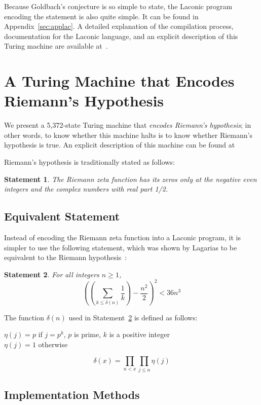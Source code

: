 \documentclass[11pt]{article}
\newtheorem{statement}{Statement}
\newcommand{\rmstatenumstate}{5,372-state }
\newenvironment{nscenter}
 {\parskip=0pt\par\nopagebreak\centering}
 {\par\noindent\ignorespacesafterend}
\begin{document}
Because Goldbach's conjecture is so simple to state, the Laconic program encoding the statement is also quite simple. It can be found in Appendix~\ref{sec:applac}. A detailed explanation of the compilation process, documentation for the Laconic language, and an explicit description of this Turing machine are available at~\cite{github}.

\section{A Turing Machine that Encodes Riemann's Hypothesis}

We present a \rmstatenumstate Turing machine that \emph{encodes Riemann's hypothesis}; in other words, to know whether this machine halts is to know whether Riemann's hypothesis is true. An explicit description of this machine can be found at~\cite{github}

Riemann's hypothesis is traditionally stated as follows:

\begin{statement}
\emph{The Riemann zeta function has its zeros only at the negative even integers and the complex numbers with real part 1/2.}
\label{goldbachstatement}
\end{statement}

\subsection{Equivalent Statement}

Instead of encoding the Riemann zeta function into a Laconic program, it is simpler to use the following statement, which was shown by Lagarias to be equivalent to the Riemann hypothesis~\cite{riemann}:

\begin{statement} \label{eq:riemann}
For all integers $n \ge 1$, 
$$\left(\left(\sum_{k \le \delta(n)} \frac{1}{k}\right) - \frac{n^2}{2}\right)^2 < 36n^3$$
\end{statement}

The function $\delta(n)$ used in Statement~\ref{eq:riemann} is defined as follows: 

\begin{nscenter}
$\eta(j) = p$ if $j = p^k$, $p$ is prime, $k$ is a positive integer \\
$\eta(j) = 1$ otherwise
\end{nscenter}
$$\delta(x) = \prod_{n<x}\prod_{j \le n} \eta(j)$$

\subsection{Implementation Methods}
\end{document}
